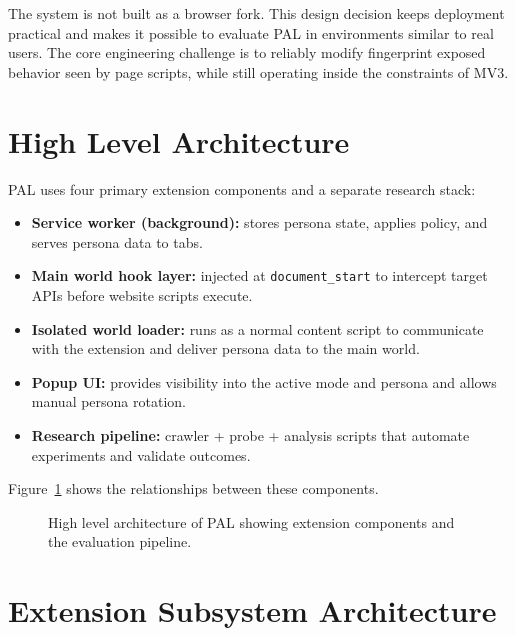 \documentclass[11pt]{report}
\begin{document}
The system is not built as a browser fork. This design decision keeps deployment practical and makes it possible to evaluate PAL in environments similar to real users. The core engineering challenge is to reliably modify fingerprint exposed behavior seen by page scripts, while still operating inside the constraints of MV3.

\section{High Level Architecture}

PAL uses four primary extension components and a separate research stack:

\begin{itemize}
    \item \textbf{Service worker (background):} stores persona state, applies policy, and serves persona data to tabs.
    \item \textbf{Main world hook layer:} injected at \texttt{document\_start} to intercept target APIs before website scripts execute.
    \item \textbf{Isolated world loader:} runs as a normal content script to communicate with the extension and deliver persona data to the main world.
    \item \textbf{Popup UI:} provides visibility into the active mode and persona and allows manual persona rotation.
    \item \textbf{Research pipeline:} crawler + probe + analysis scripts that automate experiments and validate outcomes.
\end{itemize}

Figure~\ref{fig:arch_overview} shows the relationships between these components.

\begin{figure}[H]
\centering
{}
\caption{High level architecture of PAL showing extension components and the evaluation pipeline.}
\label{fig:arch_overview}
\end{figure}

\section{Extension Subsystem Architecture}
\end{document}
